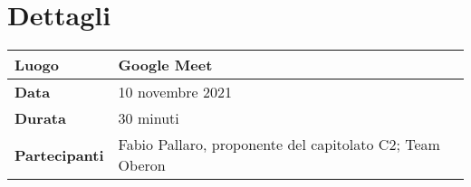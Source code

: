 \section{Dettagli}
\begin{center}
    \begin{tabular}{|l|l|}

    \hline
    \rule[-4mm]{0mm}{1cm}
    \textbf{Luogo} & Google Meet\\
    
    \hline
    \rule[-4mm]{0mm}{1cm}
    \textbf{Data} & 10 novembre 2021\\
    
    \hline
    \rule[-4mm]{0mm}{1cm}
    \textbf{Durata} & 30 minuti\\
    
    \hline
    \rule[-4mm]{0mm}{1cm}
    \textbf{Partecipanti} & Fabio Pallaro, proponente del capitolato C2; Team Oberon\\
    
    \hline
    \end{tabular}
\end{center}

